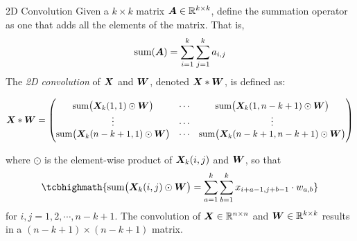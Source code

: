\begin{frame}{2D Convolution}
Given a $k \times k$ matrix ${\boldsymbol A} \in {\mathord{\mathbb R}}^{k \times k}$, 
define the summation operator as one
that adds all the elements of the matrix. That is,
\begin{align*}
    \operatorname*{sum}({\boldsymbol A}) = \sum_{i=1}^k \sum_{j=1}^k a_{i,j}
\end{align*}
The {\em 2D convolution} of ${\boldsymbol X}$ and ${\boldsymbol W}$, denoted ${\boldsymbol X} \ast
{\boldsymbol W}$, is defined as:

\begin{footnotesize}
\begin{equation*}
        {\boldsymbol X} \ast {\boldsymbol W} = \begin{pmatrix}  && \\[-1em]
        \operatorname*{sum}\bigl({\boldsymbol X}_k(1,1) \odot {\boldsymbol W}\bigr) &
        \cdots & \operatorname*{sum}\bigl({\boldsymbol X}_k(1, n-k+1) \odot {\boldsymbol W}\bigr)\\
        \vdots & \cdots & \vdots\\
        \operatorname*{sum}\bigl({\boldsymbol X}_k(n-k+1,1) \odot {\boldsymbol W}\bigr) &
        \cdots & 
        \operatorname*{sum} \bigl({\boldsymbol X}_k(n-k+1, n-k+1) \odot {\boldsymbol W}\bigr)\\[-1em]
&& \end{pmatrix}
\end{equation*}
\end{footnotesize}
where $\odot$ is the
element-wise product of ${\boldsymbol X}_k(i,j)$ and ${\boldsymbol W}$, so that
\begin{align*}
    \tcbhighmath{
    \summ\bigl(\bX_k(i,j) \odot \bW\bigr) = \sum_{a=1}^k \sum_{b=1}^k x_{i+a-1, j+b-1}
\cdot w_{a, b}}
\end{align*}
for $i, j = 1,2,\cdots,n-k+1$.
The convolution of ${\boldsymbol X} \in {\mathord{\mathbb R}}^{n\times n}$ and
${\boldsymbol W} \in {\mathord{\mathbb R}}^{k \times k}$ results in a $(n-k+1) \times (n-k+1)$ matrix.
\end{frame}
%
